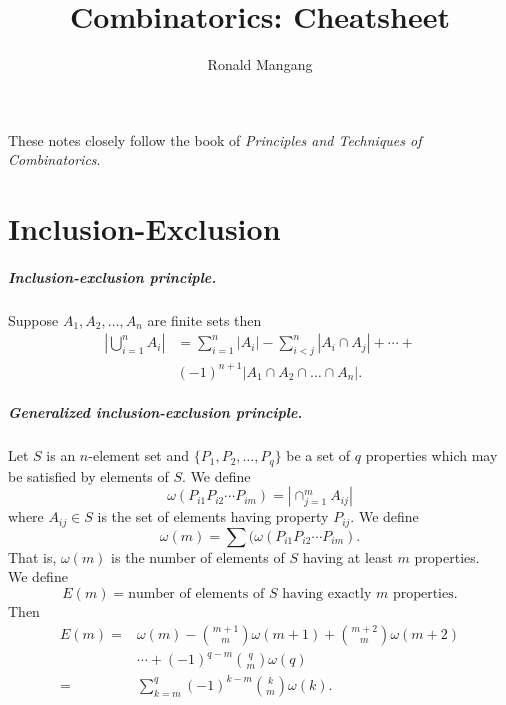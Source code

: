 \documentclass[14pt,english,oneside]{scrbook}
\numberwithin{equation}{chapter}
\theoremstyle{definition}
\theoremstyle{plain}
\begin{document}
\title{Combinatorics: Cheatsheet}
\author{Ronald Mangang}

\maketitle
\tableofcontents
\vfill
These notes closely follow the book of \textit{Principles and Techniques of Combinatorics}.
\thispagestyle{empty}
\newpage
{}


\chapter{Inclusion-Exclusion}

\paragraph{Inclusion-exclusion principle.}




Suppose $A_1, A_2, \ldots, A_n$ are finite sets then
\begin{align*}
  |\bigcup_{i=1}^n A_i | &= \sum_{i=1}^n|A_i|-\sum_{i<j}^n |A_i \cap A_j | +
  \cdots + \\
  &(-1)^{n+1} |A_1 \cap A_2 \cap \ldots \cap A_n |.
\end{align*}

\paragraph*{Generalized inclusion-exclusion principle.}
Let $S$ is an $n$-element set and $\{P_1,P_2, \ldots,P_q\}$ be a set of $q$ properties which may be satisfied by elements of $S$. We define
\[
  \omega(P_{i1}P_{i2}\cdots P_{im}) = |\cap_{j=1}^m A_{ij} |
\]
where $A_{ij} \in S$ is the set of elements having property $P_{ij}$. We define
\[
  \omega(m) = \sum(\omega(P_{i1}P_{i2}\cdots P_{im}).
\]
That is, $\omega(m)$ is the number of elements of $S$ having at least $m$ properties.\\

We define
\[
  E(m) = \text{number of elements of $S$ having exactly $m$ properties.}
\]
Then
\begin{align*}
  E(m) =& \omega(m) - \binom{m+1}{m}\omega(m+1)+\binom{m+2}{m}\omega(m+2) \\
        & \cdots + (-1)^{q-m}\binom{q}{m}\omega(q) \\
  =& \sum_{k=m}^q (-1)^{k-m}\binom{k}{m}\omega (k).
\end{align*}
\end{document}
